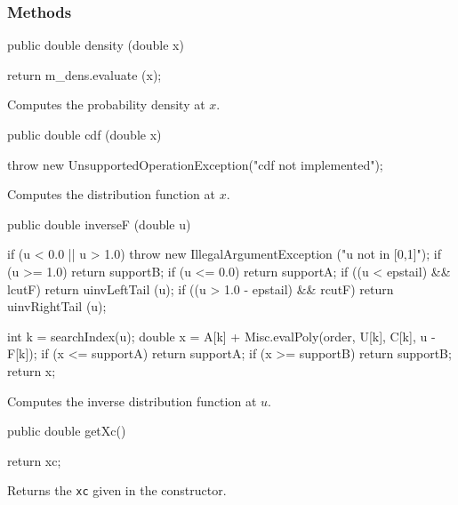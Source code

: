 \subsubsection* {Methods}
\begin{code}

   public double density (double x) \begin{hide} {
      return m_dens.evaluate (x);
   }\end{hide}
\end{code}
\begin{tabb} Computes the probability density at $x$.
\end{tabb}
\begin{code}

   public double cdf (double x) \begin{hide} {
      throw new UnsupportedOperationException("cdf not implemented");
   }\end{hide}
\end{code}
\begin{tabb}
  Computes the  distribution function at $x$.
\end{tabb}
\begin{code}

   public double inverseF (double u)\begin{hide} {
      if (u < 0.0 || u > 1.0)
          throw new IllegalArgumentException ("u not in [0,1]");
      if (u >= 1.0)
          return supportB;
      if (u <= 0.0)
          return supportA;
      if ((u < epstail) && lcutF)
         return uinvLeftTail (u);
      if ((u > 1.0 - epstail) && rcutF)
         return uinvRightTail (u);

      int k = searchIndex(u);
      double x = A[k] + Misc.evalPoly(order, U[k], C[k], u - F[k]);
      if (x <= supportA)
         return supportA;
      if (x >= supportB)
         return supportB;
      return x;
   }\end{hide}
\end{code}
 \begin{tabb} Computes the inverse distribution function at $u$.
 \end{tabb}
\begin{code}

   public double getXc()\begin{hide} {
      return xc;
   }\end{hide}
\end{code}
\begin{tabb}
   Returns the \texttt{xc} given in the constructor.
\end{tabb}
